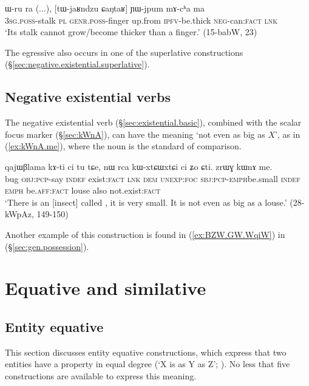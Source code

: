 \begin{exe}
\ex \label{ex:CaNtaR.YWjpum.mAcha}
 \gll ɯ-ru ra (...), [tɯ-jaʁndzu ɕaŋtaʁ] ɲɯ-jpum mɤ-cʰa ma \\
 \textsc{3sg}.\textsc{poss}-stalk \textsc{pl} {  } \textsc{genr}.\textsc{poss}-finger up.from \textsc{ipfv}-be.thick \textsc{neg}-can:\textsc{fact} \textsc{lnk} \\
 \glt `Its stalk cannot grow/become thicker than a finger.' (15-babW, 23)
 \end{exe}

The egressive  also occurs in one of the superlative constructions (§\ref{sec:negative.existential.superlative}).

\subsection{Negative existential verbs} \label{sec:existential.comparative}
The negative existential verb  (§\ref{sec:existential.basic}), combined with the scalar focus marker  (§\ref{sec:kWnA}), can have the meaning `not even as big as $X$', as in (\ref{ex:kWnA.me}), where the noun 
 is the standard of comparison.

\begin{exe}
\ex \label{ex:kWnA.me}
\gll qajɯβlama kɤ-ti ci tu tɕe, nɯ rca kɯ-xtɕɯ\redp{}xtɕi ci ʑo ɕti. zrɯɣ kɯnɤ me. \\
bug \textsc{obj}:\textsc{pcp}-say \textsc{indef} exist:\textsc{fact} \textsc{lnk} \textsc{dem} \textsc{unexp}:\textsc{foc} \textsc{sbj}:\textsc{pcp}-\textsc{emph}\redp{}be.small \textsc{indef} \textsc{emph} be.\textsc{aff}:\textsc{fact} louse also not.exist:\textsc{fact} \\
\glt `There is an [insect] called , it is very small. It is not even as big as a louse.' (28-kWpAz, 149-150)
\end{exe}
 
Another example of this construction is found in (\ref{ex:BZW.GW.WqiW}) in (§\ref{sec:gen.possession}).

\section{Equative and similative}


\subsection{Entity equative} \label{sec:equative}
This section discusses entity equative constructions, which express that two entities have a property in equal degree (`X is as Y as Z'; \citealt{haspelmath08equative}). No less that five constructions are available to express this meaning.

